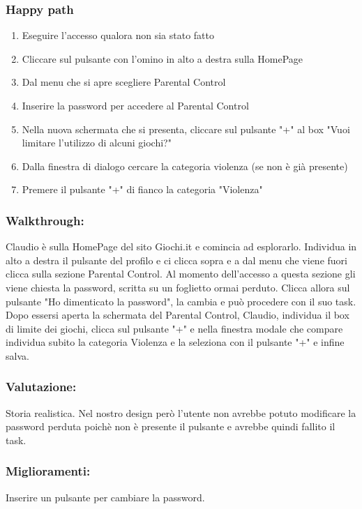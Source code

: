 \documentclass[../Report.tex]{subfiles}
\begin{document}
    \subsubsection{Happy path}
    \begin{enumerate}
        \item Eseguire l'accesso qualora non sia stato fatto 
        \item Cliccare sul pulsante con l’omino in alto a destra sulla HomePage
        \item Dal menu che si apre scegliere Parental Control
        \item Inserire la password per accedere al Parental Control        \item Nella nuova schermata che si presenta, cliccare sul pulsante "+" al box "Vuoi limitare l'utilizzo di alcuni giochi?"
        \item Dalla finestra di dialogo cercare la categoria violenza (se non è già presente)
        \item Premere il pulsante "+" di fianco la categoria "Violenza"
    \end{enumerate}

    \subsubsection{Walkthrough:}
    Claudio è sulla HomePage del sito Giochi.it e comincia ad esplorarlo. Individua in alto a destra il pulsante del profilo e ci clicca sopra e a dal menu che viene fuori clicca sulla sezione Parental Control. Al momento dell'accesso a questa sezione gli viene chiesta la password, scritta su un foglietto ormai perduto. Clicca allora sul pulsante "Ho dimenticato la password", la cambia e può procedere con il suo task. Dopo essersi aperta la schermata del Parental Control, Claudio, individua il box di limite dei giochi, clicca sul pulsante "+" e nella finestra modale che compare individua subito la categoria Violenza e la seleziona con il pulsante "+" e infine salva.  
    \subsubsection{Valutazione:}
    Storia realistica. Nel nostro design però l'utente non avrebbe potuto modificare la password perduta poichè non è presente il pulsante e avrebbe quindi fallito il task. 

    \subsubsection{Miglioramenti:}
    Inserire un pulsante per cambiare la password.
\end{document}
